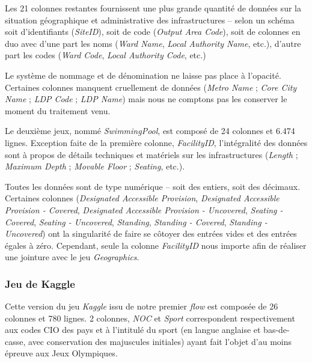 \documentclass[hidelinks, 12pt]{article}
\begin{document}
Les 21 colonnes restantes fournissent une plus grande quantité de données sur la situation géographique et administrative des infrastructures -- selon un schéma soit d'identifiants (\textit{SiteID}), soit de code (\textit{Output Area Code}), soit de colonnes en duo avec d'une part les noms (\textit{Ward Name}, \textit{Local Authority Name}, etc.), d'autre part les codes (\textit{Ward Code}, \textit{Local Authority Code}, etc.)

Le système de nommage et de dénomination ne laisse pas place à l'opacité. Certaines colonnes manquent cruellement de données (\textit{Metro Name} ; \textit{Core City Name} ; \textit{LDP Code} ; \textit{LDP Name}) mais nous ne comptons pas les conserver le moment du traitement venu.
\newline

Le deuxième jeux, nommé \textit{SwimmingPool}, est composé de 24 colonnes et 6.474 lignes. Exception faite de la première colonne, \textit{FacilityID}, l'intégralité des données sont à propos de détails techniques et matériels sur les infrastructures (\textit{Length} ; \textit{Maximum Depth} ; \textit{Movable Floor} ; \textit{Seating}, etc.).

Toutes les données sont de type numérique -- soit des entiers, soit des décimaux. Certaines colonnes (\textit{Designated Accessible Provision}, \textit{Designated Accessible Provision - Covered}, \textit{Designated Accessible Provision - Uncovered}, \textit{Seating - Covered}, \textit{Seating - Uncovered}, \textit{Standing}, \textit{Standing - Covered}, \textit{Standing - Uncovered}) ont la singularité de faire se côtoyer des entrées vides et des entrées égales à zéro. Cependant, seule la colonne \emph{FacilityID} nous importe afin de réaliser une jointure avec le jeu \textit{Geographics}.





%





\subsubsection{Jeu de Kaggle}

Cette version du jeu \textit{Kaggle} issu de notre premier \textit{flow} est composée de 26 colonnes et 780 lignes. 2 colonnes, \textit{NOC} et \textit{Sport} correspondent respectivement aux codes CIO des pays et à l'intitulé du sport (en langue anglaise et bas-de-casse, avec conservation des majuscules initiales) ayant fait l'objet d'au moins épreuve aux Jeux Olympiques.
\end{document}
